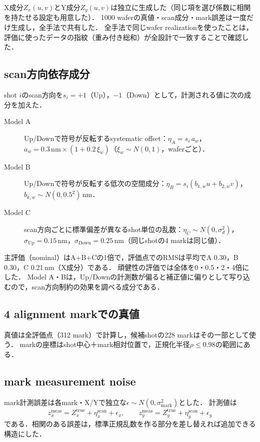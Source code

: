 \documentclass[10.5pt,a4paper]{ltjsarticle}
\newcommand{\nm}{\,\mathrm{nm}}
\begin{document}
X成分$Z_x(u,v)$とY成分$Z_y(u,v)$は独立に生成した（同じ項を選び係数に相関を持たせる設定も用意した）．
1000 waferの真値・scan成分・mark誤差は一度だけ生成し，全手法で共有した．
全手法で同じwafer realizationを使ったことは，評価に使ったデータの指紋（重み付き総和）が全設計で一致することで確認した．

\subsection{scan方向依存成分}

shot $i$のscan方向を$s_i=+1$（Up），$-1$（Down）として，計測される値に次の成分を加えた．
\begin{description}
  \item[Model A] Up/Downで符号が反転するsystematic offset：$\eta_A=s_i\,a_w$，$a_w=0.3\nm\times(1+0.2\,\xi_w)$（$\xi_w\sim N(0,1)$，waferごと）．
  \item[Model B] Up/Downで符号が反転する低次の空間成分：$\eta_B=s_i(b_{1,w}u+b_{2,w}v)$，$b_{k,w}\sim N(0,0.5^2)$\,nm．
  \item[Model C] scan方向ごとに標準偏差が異なるshot単位の乱数：$\eta_C\sim N(0,\sigma_d^2)$，$\sigma_\text{Up}=0.15\nm$，$\sigma_\text{Down}=0.25\nm$（同じshotの4 markは同じ値）．
\end{description}
主評価（nominal）はA+B+Cの1倍で，評価点でのRMSは平均でA 0.30，B 0.30，C 0.21\,nm（X成分）である．
頑健性の評価では全体を0・0.5・2・4倍にした．
Model A・Bは，Up/Downの計測数が偏ると補正値に偏りとして写り込むので，scan方向制約の効果を調べる成分である．

\subsection{4 alignment markでの真値}

真値は全評価点（312 mark）で計算し，候補shotの228 markはその一部として使う．
markの座標はshot中心＋mark相対位置で，正規化半径$\rho\le0.98$の範囲にある．

\subsection{mark measurement noise}

mark計測誤差は各mark・X/Yで独立な$\epsilon\sim N(0,\sigma_\text{mark}^2)$とした．
計測値は
\begin{equation}
  z_x^\text{meas}=Z_x^\text{true}+\eta_x^\text{scan}+\epsilon_x,\qquad
  z_y^\text{meas}=Z_y^\text{true}+\eta_y^\text{scan}+\epsilon_y
\end{equation}
である．相関のある誤差は，標準正規乱数を作る部分を差し替えれば追加できる構造にした．
\end{document}
